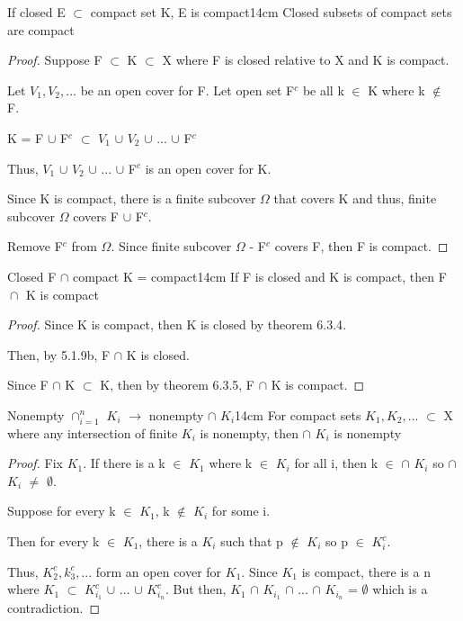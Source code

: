 	\begin{wtheorem}{If closed E $\subset$ compact set K, E is compact}{14cm}
		Closed subsets of compact sets are compact
	\end{wtheorem}
	
	\begin{proof}
		Suppose F $\subset$ K $\subset$ X where F is closed relative to X
		and K is compact.

		Let $V_1, V_2, ...$ be an open cover for F.
		Let open set F$^c$ be all k $\in$ K where k $\not \in$ F.

		\qquad K = F $\cup$ F$^c$ $\subset$ $V_1$ $\cup$ $V_2$ $\cup$ ... $\cup$ F$^c$

		Thus, $V_1$ $\cup$ $V_2$ $\cup$ ... $\cup$ F$^c$ is an open cover for K.

		Since K is compact, there is a finite subcover $\Omega$ that covers K
		and thus, finite subcover $\Omega$ covers F $\cup$ F$^c$.
		
		Remove F$^c$ from $\Omega$. Since finite subcover $\Omega$ - F$^c$ covers F,
		then F is compact.
	\end{proof}

	 \vspace{0.5cm}



	 \begin{corollary}{Closed F $\cap$ compact K = compact}{14cm}
		If F is closed and K is compact, then F $\cap_{}^{}$ K is compact 
	 \end{corollary}
	 
	 \begin{proof}
		Since K is compact, then K is closed by {\color{red} theorem 6.3.4}.

		Then, by {\color{red} 5.1.9b}, F $\cap$ K is closed.

		Since F $\cap$ K $\subset$ K, then by {\color{red} theorem 6.3.5},
		F $\cap$ K is compact. 
	 \end{proof}

	\newpage


	
	\begin{wtheorem}{Nonempty $\cap_{i=1}^n$ $K_i$ $\rightarrow$
	nonempty $\cap$ $K_i$}{14cm}
		For compact sets $K_1, K_2, ...$ $\subset$ X where any intersection
		of finite $K_i$ is nonempty, then $\cap$ $K_i$ is nonempty		
	\end{wtheorem}
	
	\begin{proof}
		Fix $K_1$.
		If there is a k $\in$ $K_1$ where k $\in$ $K_i$ for all i, then
		k $\in$ $\cap$ $K_i$ so $\cap$ $K_i$ $\not =$ $\emptyset$.

		Suppose for every k $\in$ $K_1$, k $\not \in$ $K_i$ for some i.

		Then for every k $\in$ $K_1$, there is a $K_i$ such that
		p $\not \in$ $K_i$ so p $\in$ $K_i^c$.

		Thus, $K_2^c, k_3^c, ...$ form an open cover for $K_1$.
		Since $K_1$ is compact, there is a n where
		$K_1$ $\subset$ $K_{i_1}^c$ $\cup$ ... $\cup$ $K_{i_n}^c$.
		But then, $K_1$ $\cap$ $K_{i_1}$ $\cap$ ... $\cap$ $K_{i_n}$
		= $\emptyset$ which is a contradiction.
	\end{proof}

